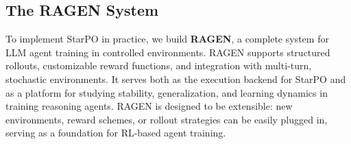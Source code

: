 \subsection{The RAGEN System}

To implement StarPO in practice, we build \textbf{RAGEN}, a complete system for LLM agent training in controlled environments. RAGEN supports structured rollouts, customizable reward functions, and integration with multi-turn, stochastic environments. It serves both as the execution backend for StarPO and as a platform for studying stability, generalization, and learning dynamics in training reasoning agents.
RAGEN is designed to be extensible: new environments, reward schemes, or rollout  strategies can be easily plugged in, serving as a foundation for RL-based agent training.






